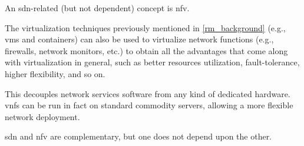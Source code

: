 An \gls{sdn}-related (but not dependent) concept is \gls{nfv}. 

The virtualization techniques previously mentioned in \autoref{rm_background} (e.g., \glspl{vm} and containers) can also be used to virtualize network functions (e.g., firewalls, network monitors, etc.) to obtain all the advantages that come along with virtualization in general, such as better resources utilization, fault-tolerance, higher flexibility, and so on.

This decouples network services software from any kind of dedicated hardware.
\Glspl{vnf} can be run in fact on standard commodity servers, allowing a more flexible network deployment.

\gls{sdn} and \gls{nfv} are complementary, but one does not depend upon the other.